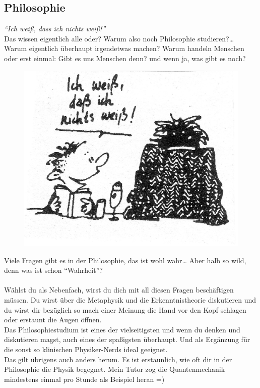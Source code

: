 \subsection{Philosophie}

\textit{"`Ich weiß, dass ich nichts weiß!"'} \\
Das wissen eigentlich alle oder?
Warum also noch Philosophie studieren?\ldots
Warum eigentlich \"uberhaupt irgendetwas machen?
Warum handeln Menschen oder erst einmal:
Gibt es uns Menschen denn? und wenn ja, was gibt es noch? 
\begin{figure}[!b]
  \begin{center}
    \includegraphics[width=.275\textwidth]{bilder/Ich_weiss.jpg}
  \end{center}
\end{figure}

Viele Fragen gibt es in der Philosophie, das ist wohl wahr\ldots
Aber halb so wild, denn was ist schon "`Wahrheit"'?\\
\\
W\"ahlst du  als Nebenfach, wirst du dich mit all diesen Fragen besch\"aftigen m\"ussen.
Du wirst \"uber die Metaphysik und die Erkenntnistheorie diskutieren
und du wirst dir bez\"uglich so mach einer Meinung die Hand vor den Kopf schlagen oder erstaunt die Augen \"offnen. \\
Das Philosophiestudium ist eines der vielseitigsten und wenn du denken und diskutieren magst,
auch eines der spaßigsten \"uberhaupt.
Und als Erg\"anzung f\"ur die sonst so klinischen Physiker-Nerds ideal geeignet. \\
Das gilt \"ubrigens auch anders herum.
Es ist erstaunlich, wie oft dir in der Philosophie die Physik begegnet.
Mein Tutor zog die Quantenmechanik mindestens einmal pro Stunde als Beispiel heran =)

